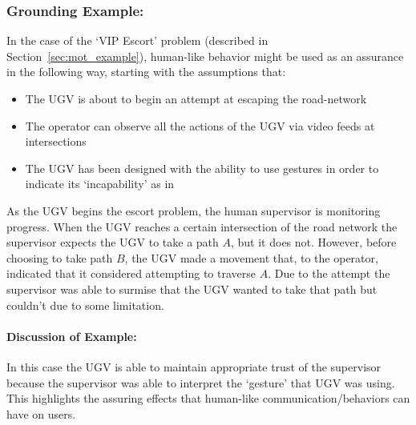 \subsubsection{Grounding Example:}
In the case of the `VIP Escort' problem (described in Section~\ref{sec:mot_example}), human-like behavior might be used as an assurance in the following way, starting with the assumptions that:

\begin{itemize}
    \item The UGV is about to begin an attempt at escaping the road-network
    \item The operator can observe all the actions of the UGV via video feeds at intersections
    \item The UGV has been designed with the ability to use gestures in order to indicate its `incapability' as in \cite{Kwon2018-xt}
\end{itemize}

As the UGV begins the escort problem, the human supervisor is monitoring progress. When the UGV reaches a certain intersection of the road network the supervisor expects the UGV to take a path $A$, but it does not. However, before choosing to take path $B$, the UGV made a movement that, to the operator, indicated that it considered attempting to traverse $A$. Due to the attempt the supervisor was able to surmise that the UGV wanted to take that path but couldn't due to some limitation.

\paragraph{\textbf{Discussion of Example:}} In this case the UGV is able to maintain appropriate trust of the supervisor because the supervisor was able to interpret the `gesture' that UGV was using. This highlights the assuring effects that human-like communication/behaviors can have on users.
